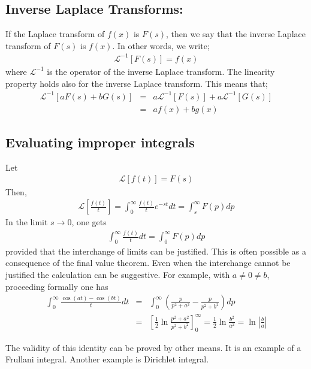 \documentclass[11pt]{report}
\newcommand{\sps}{\\[0.2cm]}
\newcommand{\NI}{\noindent}
\begin{document}
	\subsection{Inverse Laplace Transforms:}
	If the Laplace transform of $f(x)$ is $F(s)$, then we say that the inverse Laplace transform of $F(s)$ is $f(x)$. In other words, we write;
	\begin{eqnarray*}
		\mathcal{L}^{-1}[F(s)] = f(x)
	\end{eqnarray*}
	where $\mathcal{L}^{-1}$ is the operator of the inverse Laplace transform. The linearity property holds also for the inverse Laplace transform. This means that;
	\begin{eqnarray*}
		\mathcal{L}^{-1}[aF(s) + bG(s)] &=& a \mathcal{L}^{-1}[F(s)] +  a \mathcal{L}^{-1}[G(s)]\sps
		&=& af(x) + bg(x)
	\end{eqnarray*}


	\subsection{Evaluating improper integrals}
	Let
	\begin{eqnarray*}
		\mathcal{L}[f(t)] = F(s)
	\end{eqnarray*}
	Then,
	\begin{eqnarray*}
		\mathcal{L}[\frac{f(t)}{t}] = \int_{0}^{\infty} \frac{f(t)}{t} e^{-st}dt = \int_{s}^{\infty} F(p) dp
	\end{eqnarray*}
	In the limit $s \to 0$, one gets
	\begin{eqnarray*}
		\int_{0}^{\infty} \frac{f(t)}{t}dt= \int_{0}^{\infty} F(p)dp
	\end{eqnarray*}
	provided that the interchange of limits can be justified. This is often possible as a consequence of the final value theorem. Even when the interchange cannot be justified the calculation can be suggestive. For example, with $a \neq 0 \neq b$, proceeding formally one has
	\begin{eqnarray*}
		\int_{0}^{\infty} \frac{\cos(at) - \cos(bt)}{t} dt &=& \int_{0}^{\infty} \left(\frac{p}{p^2 + a^2} - \frac{p}{p^2 + b^2}\right) dp\sps
		&=& \left[\frac{1}{2} \ln\frac{p^2 + a^2}{p^2 + b^2}\right]_{0}^{\infty} = \frac{1}{2} \ln\frac{b^2}{a^2} = \ln\left|\frac{b}{a}\right|
	\end{eqnarray*}
	
	\NI The validity of this identity can be proved by other means. It is an example of a Frullani integral. Another example is Dirichlet integral.
	
\end{document}
